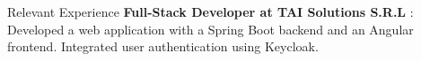 \begin{rubric}{Relevant Experience}
\entry*[2022 -- 2022]%
	\textbf{Full-Stack Developer at TAI Solutions S.R.L} : Developed a web application with a Spring Boot backend and an Angular frontend. Integrated user authentication using Keycloak.
%
\end{rubric}